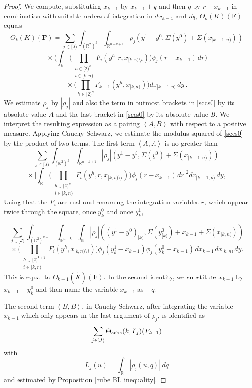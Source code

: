 \documentclass[12pt,reqno]{amsart}
\theoremstyle{plain}
\numberwithin{equation}{section}
\theoremstyle{remark}
\newcommand{\R}{{\mathbb R}}
\newcommand{\F}{\mathbf{F}}
\begin{document}
\begin{proof}
We compute, substituting $x_{k-1}$ by $x_{k-1}+q$ and then $q$ by $r-x_{k-1}$ in combination with suitable orders of integration in $dx_{k-1}$ and $dq$, $\Theta_k(K)(\F)$ equals
\begin{equation}\label{sccs0}
\Theta_k(K)(\F)=\sum_{j\in[J)} \int_{(\R^2)^k}\int_{\R^{n-k+1}}
\rho_j(y^1-y^0,\Sigma(y^0)+\Sigma(x_{[k-1,n)}))
\end{equation}
\[
{}\times
\Big(
\int_\R
\Big(
\prod_{\substack{h\in[2)^k\\ i\in[k,n)}}
F_{i}(y^h,r,x_{[k,n)\setminus i})
\Big)
\phi_j(r-x_{k-1})\,dr
\Big)
\]
\[
{}\times
\Big(
\prod_{h\in[2)^k}F_{k-1}(y^h,x_{[k,n)})
\Big)
dx_{[k-1,n)}\,dy\, .
\]
We estimate $\rho_j$ by $|\rho_j|$ and also the term in outmost brackets in \eqref{sccs0} by its absolute value $A$
and the last bracket in \eqref{sccs0} by its absolute value $B$.
We interpret the resulting expression as a pairing $\left< A , B \right>$ with respect to a positive measure.
Applying Cauchy-Schwarz, we estimate the modulus squared of \eqref{sccs0} by the product of two terms.
The first term $\left< A , A \right>$ is no greater than
\[
\sum_{j\in[J)}\int_{(\R^2)^k}\int_{\R^{n-k+1}}
|\rho_j|(y^1-y^0,\Sigma(y^0)+\Sigma(x_{[k-1,n)}))
\]
\[
{}\times
\Big|
\int_\R
\Big(
\prod_{\substack{h\in[2)^k\\ i\in[k,n)}}
F_{i}(y^h,r,x_{[k,n)\setminus i})
\Big)
\phi_j(r-x_{k-1})\,dr
\Big|^2
dx_{[k-1,n)}\,dy,
\]
Using that the $F_i$ are real and renaming the integration variables $r$, which appear twice
through the square, once $y_k^0$ and once $y_k^1$,

\[
\sum_{j\in[J)}\int_{(\R^2)^{k+1}}\int_{\R^{n-k}}
\int_\R
|\rho_j|((y^1-y^0)_{[k)},\Sigma(y^0_{[k)})+x_{k-1}+\Sigma(x_{[k,n)}))
\]
\[
{}\times
\Big(
\prod_{\substack{h\in[2)^{k+1}\\ i\in[k,n)}}
F_{i}(y^h,x_{[k,n)\setminus i})
\Big)
\phi_j(y_k^1-x_{k-1})\phi_j(y_k^0-x_{k-1})
\,dx_{k-1}\,dx_{[k,n)}\,dy.
\]
This is equal to $\Theta_{k+1}(\tilde{K})(\F)$.
In the second identity, we substitute
$x_{k-1}$ by $x_{k-1}+y_k^0$ and then name the variable $x_{k-1}$ as $-q$.

The second term $\left< B , B \right>$, in Cauchy-Schwarz, after integrating the variable $x_{k-1}$ which only appears in the last argument of $\rho_j$,
is identified as
\begin{equation}
    \sum_{j\in[J)} \Theta_{\rm cube}(k,L_j)(F_{k-1})
\end{equation}
with
\begin{equation}
    L_j(u)=\int_\R |\rho_j(u,q)|\,dq
\end{equation}
and estimated by Proposition \ref{cube BL inequality}.
\end{proof}
\end{document}
